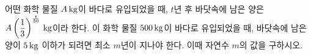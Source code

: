 어떤 화학 물질 $A\mkern3mu \mathrm{kg}$이 바다로 유입되었을 때, $t$년 후 바닷속에 남은 양은 $A\left(\dfrac{1}{3}\right)^{\frac{t}{50}}\mkern3mu \mathrm{kg}$이라 한다. 이 화학 물질 $500\mkern3mu \mathrm{kg}$이 바다로 유입되었을 때, 바닷속에 남은 양이 $5\mkern3mu \mathrm{kg}$ 이하가 되려면 최소 $m$년이 지나야 한다. 이때 자연수 $m$의 값을 구하시오. 
